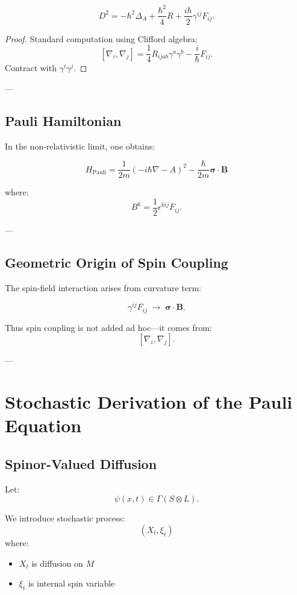 \begin{theorem}
\[
D^2 =
-\hbar^2 \Delta_A
+ \frac{\hbar^2}{4} R
+ \frac{i\hbar}{2} \gamma^{ij} F_{ij}.
\]
\end{theorem}

\begin{proof}
Standard computation using Clifford algebra:
\[
[\nabla_i,\nabla_j] = \frac{1}{4}R_{ijab}\gamma^a\gamma^b - \frac{i}{\hbar}F_{ij}.
\]
Contract with $\gamma^i\gamma^j$.
\end{proof}

---

\subsection{Pauli Hamiltonian}

In the non-relativistic limit, one obtains:

\[
\boxed{
H_{\mathrm{Pauli}}
=
\frac{1}{2m}(-i\hbar\nabla - A)^2
- \frac{\hbar}{2m} \bm{\sigma}\cdot \bm{B}
}
\]

where:
\[
B^k = \frac{1}{2}\epsilon^{kij} F_{ij}.
\]

---

\subsection{Geometric Origin of Spin Coupling}

The spin-field interaction arises from curvature term:

\[
\gamma^{ij} F_{ij}
\;\longrightarrow\;
\bm{\sigma}\cdot \bm{B}.
\]

Thus spin coupling is not added ad hoc—it comes from:
\[
[\nabla_i,\nabla_j].
\]

---

\section{Stochastic Derivation of the Pauli Equation}

\subsection{Spinor-Valued Diffusion}

Let:
\[
\psi(x,t) \in \Gamma(S \otimes L).
\]

We introduce stochastic process:
\[
(X_t, \xi_t)
\]
where:
\begin{itemize}
\item $X_t$ is diffusion on $M$
\item $\xi_t$ is internal spin variable
\end{itemize}

